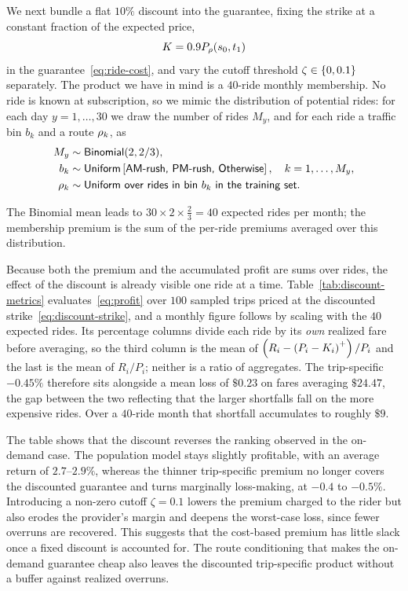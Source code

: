 \documentclass[12pt]{article}
\begin{document}
{{{{{{{{We next bundle a flat $10\%$ discount into the guarantee, fixing the strike at a constant
fraction of the expected price,
\begin{equation}\label{eq:discount-strike}
    K = 0.9 P_\rho({s_0}, t_1)
\end{equation}
in the guarantee~\eqref{eq:ride-cost}, and vary the cutoff threshold $\zeta \in \left\{0, 0.1\right\}$
separately. The product we have in mind is a $40$-ride monthly membership. No ride is
known at subscription, so we mimic the distribution of potential rides: for each day
$y = 1, \dots, 30$ we draw the number of rides $M_y$, and for each ride a traffic bin $b_k$ and a route $\rho_k$, as
\begin{equation} \label{eq:counterfactual_rider}
\begin{aligned}
    M_y     & \sim \textsf{Binomial}(2, 2/3), \\
    b_k     & \sim \textsf{Uniform}\left[\textsf{AM-rush, PM-rush, Otherwise}\right], \quad k = 1, \dots, M_y, \\
    \rho_k & \sim \textsf{Uniform over rides in bin } b_k \textsf{ in the training set}.
\end{aligned}
\end{equation}

The Binomial mean leads to $30 \times 2 \times \tfrac{2}{3} = 40$ expected rides per month; the membership premium is the sum of the per-ride premiums averaged over this distribution.

Because both the premium and the accumulated profit are sums over rides, the effect of the
discount is already visible one ride at a time. 
Table~\ref{tab:discount-metrics} evaluates~\eqref{eq:profit} over $100$ sampled trips priced at
the discounted strike~\eqref{eq:discount-strike}, and a monthly figure follows by scaling with
the $40$ expected rides. Its percentage columns divide each ride by its \emph{own} realized
fare before averaging, so the third column is the mean of
$\left(R_i - \left(P_i - K_i\right)^{+}\right)/P_i$ and the last is the mean of $R_i/P_i$; neither is a ratio
of aggregates. The trip-specific $-0.45\%$ therefore sits alongside a mean loss of $\$0.23$ on
fares averaging $\$24.47$, the gap between the two reflecting that the larger shortfalls fall
on the more expensive rides. Over a $40$-ride month that shortfall accumulates to roughly
$\$9$.

The table shows that the discount reverses the
ranking observed in the on-demand case. The population model stays slightly profitable, with an average return of $2.7$--$2.9\%$, whereas the thinner trip-specific premium no longer covers the discounted guarantee and turns marginally loss-making, at $-0.4$ to $-0.5\%$. 
Introducing a non-zero cutoff $\zeta = 0.1$ lowers the premium charged to the rider but also erodes the provider's margin and deepens the worst-case loss, since fewer overruns are recovered. 
This suggests that the cost-based premium has little slack once a fixed discount is accounted for.  
The route conditioning that makes the on-demand guarantee cheap also leaves the discounted trip-specific product without a buffer against realized overruns.

}}}}}}}}
\end{document}
